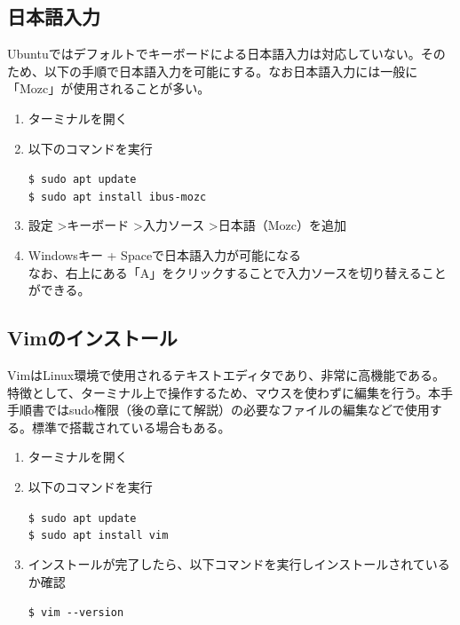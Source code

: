 \documentclass[a4paper, 11pt, dvipdfmx]{jsarticle}
\begin{document}
\subsection{日本語入力}
  Ubuntuではデフォルトでキーボードによる日本語入力は対応していない。そのため、以下の手順で日本語入力を可能にする。なお日本語入力には一般に「Mozc」が使用されることが多い。
  \begin{enumerate}
    \item ターミナルを開く
    \item 以下のコマンドを実行
    \begin{terminalbox}
      \verb|$ sudo apt update|\\
      \verb|$ sudo apt install ibus-mozc|
    \end{terminalbox}
    \item 設定 \textgreater キーボード \textgreater 入力ソース \textgreater 日本語（Mozc）を追加
    \item Windowsキー + Spaceで日本語入力が可能になる\\
    なお、右上にある「A」をクリックすることで入力ソースを切り替えることができる。
  \end{enumerate}

\subsection{Vimのインストール}
  VimはLinux環境で使用されるテキストエディタであり、非常に高機能である。特徴として、ターミナル上で操作するため、マウスを使わずに編集を行う。本手手順書ではsudo権限（後の章にて解説）の必要なファイルの編集などで使用する。標準で搭載されている場合もある。
  \begin{enumerate}
    \item ターミナルを開く
    \item 以下のコマンドを実行
    \begin{terminalbox}
      \verb|$ sudo apt update|\\
      \verb|$ sudo apt install vim|
    \end{terminalbox}
    \item インストールが完了したら、以下コマンドを実行しインストールされているか確認
    \begin{terminalbox}
      \verb|$ vim --version|
    \end{terminalbox}
  \end{enumerate}
\end{document}
